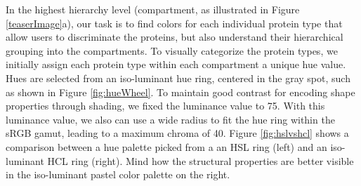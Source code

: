 \documentclass{egpubl}
\begin{document}
	In the highest hierarchy level (compartment, as illustrated in Figure \ref{teaserImage}a), our task is to find colors for each individual protein type that allow users to discriminate the proteins, but also understand their hierarchical grouping into the compartments. 
	To visually categorize the protein types, we initially assign each protein type within each compartment a unique hue value. 
	Hues are selected from an iso-luminant hue ring, centered in the gray spot, such as shown in Figure \ref{fig:hueWheel}. 
	To maintain good contrast for encoding shape properties through shading, we fixed the luminance value to 75. 
	With this luminance value, we also can use a wide radius to fit the hue ring within the sRGB gamut, leading to a maximum chroma of 40. 
	Figure \ref{fig:hslvshcl} shows a comparison between a hue palette picked from a an HSL ring (left) and an iso-luminant HCL ring (right). 
	Mind how the structural properties are better visible in the iso-luminant pastel color palette on the right. 
	
	

			
\end{document}
